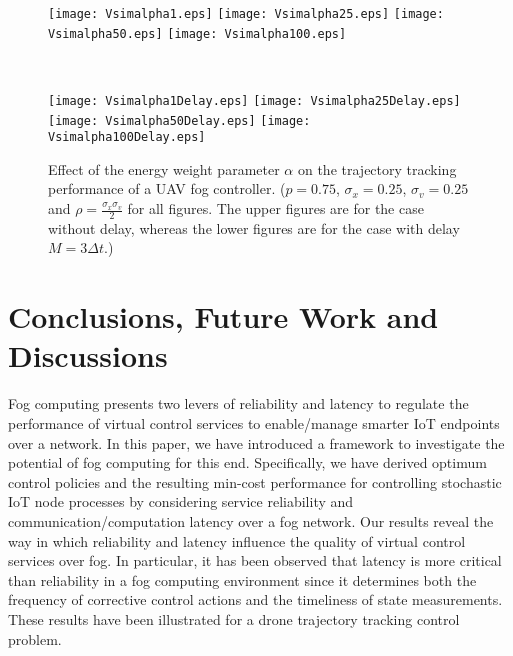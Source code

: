 \documentclass[10pt, journal, letterpaper]{IEEEtran}
\newcommand{\1}{\ensuremath{\mathbf{1}}} %
\begin{document}
\begin{figure*}[!t]
\begin{minipage}[t]{20cm}
\begin{center}
\hspace{-1.75cm}
\texttt{[image: Vsimalpha1.eps]}
%
\hspace{-0.5cm}
%
\texttt{[image: Vsimalpha25.eps]}
%
\hspace{-0.5cm}
%
\texttt{[image: Vsimalpha50.eps]}
%
\hspace{-0.5cm}
%
\texttt{[image: Vsimalpha100.eps]}
\end{center}
\end{minipage}
%
\\
%
\begin{minipage}[t]{20cm}
\begin{center}
\hspace{-1.75cm}
\texttt{[image: Vsimalpha1Delay.eps]}
%
\hspace{-0.5cm}
%
\texttt{[image: Vsimalpha25Delay.eps]}
%
\hspace{-0.5cm}
%
\texttt{[image: Vsimalpha50Delay.eps]}
%
\hspace{-0.5cm}
%
\texttt{[image: Vsimalpha100Delay.eps]}
\end{center}
\end{minipage}
\caption{Effect of the energy weight parameter $\alpha$ on the trajectory tracking performance of a UAV fog controller. ($p = 0.75$, $\sigma_x = 0.25$, $\sigma_v = 0.25$ and $\rho = \frac{\sigma_x \sigma_v}{2}$ for all figures. The upper figures are for the case without delay, whereas the lower figures are for the case with delay $M = 3 \Delta t$.)}  \label{Fig: Figure 4}
\end{figure*}




\section{Conclusions, Future Work and Discussions} \label{Section: Conclusions}
Fog computing presents two levers of reliability and latency to regulate the performance of virtual control services to enable/manage smarter IoT endpoints over a network. In this paper, we have introduced a framework to investigate the potential of fog computing for this end. Specifically, we have derived optimum control policies and the resulting min-cost performance for controlling stochastic IoT node processes by considering service reliability and communication/computation latency over a fog network. Our results reveal the way in which reliability and latency influence the quality of virtual control services over fog. In particular, it has been observed that latency is more critical than reliability in a fog computing environment since it determines both the frequency of corrective control actions and the timeliness of state measurements. These results have been illustrated for a drone trajectory tracking control problem.
\end{document}
